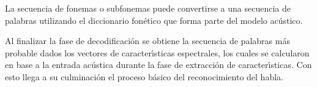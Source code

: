 La secuencia de fonemas o subfonemas puede convertirse a una secuencia de palabras utilizando el diccionario
fon\'etico que forma parte del modelo ac\'ustico.

Al finalizar la fase de decodificaci\'on se obtiene la secuencia de palabras m\'as probable dados los vectores
de caracter{\'\i}sticas espectrales, los cuales se calcularon en base a la entrada ac\'ustica durante
la fase de extracci\'on de caracter{\'\i}sticas. Con esto llega a su culminaci\'on el proceso b\'asico
del reconocimiento del habla.